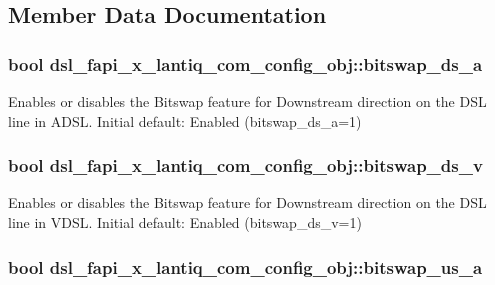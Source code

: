 \subsection{Member Data Documentation}
\hypertarget{structdsl__fapi__x__lantiq__com__config__obj_ad6bb2f5e64af8a45c8b7e76b51e7fae4}{
\subsubsection[{bitswap\-\_\-ds\-\_\-a}]{\setlength{\rightskip}{0pt plus 5cm}bool dsl\-\_\-fapi\-\_\-x\-\_\-lantiq\-\_\-com\-\_\-config\-\_\-obj\-::bitswap\-\_\-ds\-\_\-a}}\label{structdsl__fapi__x__lantiq__com__config__obj_ad6bb2f5e64af8a45c8b7e76b51e7fae4}
Enables or disables the Bitswap feature for Downstream direction on the D\-S\-L line in A\-D\-S\-L. Initial default\-: Enabled (bitswap\-\_\-ds\-\_\-a=1) \hypertarget{structdsl__fapi__x__lantiq__com__config__obj_adb7c968724b7a3c6a75d3a93ce3b4403}{
\subsubsection[{bitswap\-\_\-ds\-\_\-v}]{\setlength{\rightskip}{0pt plus 5cm}bool dsl\-\_\-fapi\-\_\-x\-\_\-lantiq\-\_\-com\-\_\-config\-\_\-obj\-::bitswap\-\_\-ds\-\_\-v}}\label{structdsl__fapi__x__lantiq__com__config__obj_adb7c968724b7a3c6a75d3a93ce3b4403}
Enables or disables the Bitswap feature for Downstream direction on the D\-S\-L line in V\-D\-S\-L. Initial default\-: Enabled (bitswap\-\_\-ds\-\_\-v=1) \hypertarget{structdsl__fapi__x__lantiq__com__config__obj_a0c0f55d074b84a3d28caa3973ef1bef9}{
\subsubsection[{bitswap\-\_\-us\-\_\-a}]{\setlength{\rightskip}{0pt plus 5cm}bool dsl\-\_\-fapi\-\_\-x\-\_\-lantiq\-\_\-com\-\_\-config\-\_\-obj\-::bitswap\-\_\-us\-\_\-a}}\label{structdsl__fapi__x__lantiq__com__config__obj_a0c0f55d074b84a3d28caa3973ef1bef9}
